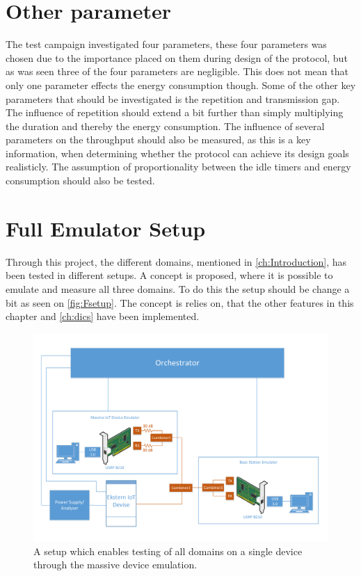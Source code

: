 \section{Other parameter}
The test campaign investigated four parameters, these four parameters was chosen due to the importance placed on them during design of the protocol, but as was seen three of the four parameters are negligible. This does not mean that only one parameter effects the energy consumption though. Some of the other key parameters that should be investigated is the repetition and transmission gap. The influence of repetition should extend a bit further than simply multiplying the duration and thereby the energy consumption. The influence of several parameters on the throughput should also be measured, as this is a key information, when determining whether the protocol can achieve its design goals realisticly. The assumption of proportionality between the idle timers and energy consumption should also be tested.

\section{Full Emulator Setup}
Through this project, the different domains, mentioned in \autoref{ch:Introduction}, has been tested in different setups. A concept is proposed, where it is possible to emulate and measure all three domains. To do this the setup should be change a bit as seen on \autoref{fig:Fsetup}. The concept is relies on, that the other features in this chapter and \autoref{ch:dics} have been implemented. 

\begin{figure}[H]
\centering
\includegraphics[width=\textwidth]{figures/General_test_setup.pdf}
\caption{A setup which enables testing of all domains on a single device through the massive device emulation.}
\label{fig:Fsetup}
\end{figure}


